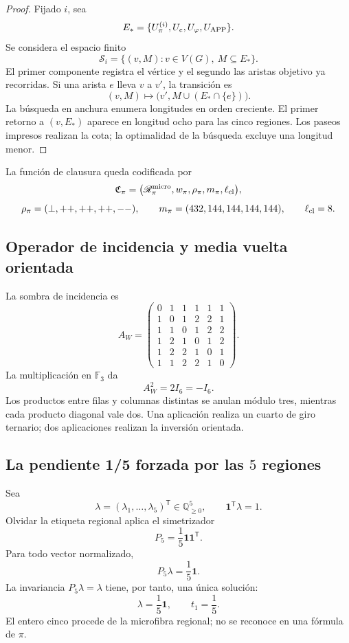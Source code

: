 \begin{proof}
Fijado \(i\), sea
\[
 E_*=\{U_\pi^{(i)},U_e,U_\varphi,U_{\rm APP}\}.
\]
Se considera el espacio finito
\[
 \mathscr S_i=\{(v,M):v\in V(G),\ M\subseteq E_*\}.
\]
El primer componente registra el vértice y el segundo las aristas objetivo
ya recorridas. Si una arista \(e\) lleva \(v\) a \(v'\), la transición es
\[
 (v,M)\longmapsto
 \bigl(v',M\cup(E_*\cap\{e\})\bigr).
\]
La búsqueda en anchura enumera longitudes en orden creciente. El primer
retorno a \((v,E_*)\) aparece en longitud ocho para las cinco regiones.
Los paseos impresos realizan la cota; la optimalidad de la búsqueda excluye
una longitud menor.
\end{proof}

La función de clausura queda codificada por
\[
 \mathfrak C_\pi=
 \bigl(\mathscr R_\pi^{\rm micro},
 w_\pi,\rho_\pi,m_\pi,\ell_{\rm cl}\bigr),
\]
\[
 \rho_\pi=(\perp,++ ,++ ,++ ,--),
 \qquad
 m_\pi=(432,144,144,144,144),
 \qquad
 \ell_{\rm cl}=8.
\]

\subsection{Operador de incidencia y media vuelta orientada}

La sombra de incidencia es
\[
 A_W=
 \begin{pmatrix}
 0&1&1&1&1&1\\
 1&0&1&2&2&1\\
 1&1&0&1&2&2\\
 1&2&1&0&1&2\\
 1&2&2&1&0&1\\
 1&1&2&2&1&0
 \end{pmatrix}.
\]
La multiplicación en \(\mathbb F_3\) da
\begin{equation}
 \boxed{A_W^2=2I_6=-I_6.}
 \label{p12-83-c9-s1:eq:aw-cuadrado-menos-identidad-pi}
\end{equation}
Los productos entre filas y columnas distintas se anulan módulo tres,
mientras cada producto diagonal vale dos. Una aplicación realiza un cuarto
de giro ternario; dos aplicaciones realizan la inversión orientada.

\subsection{La pendiente 1/5 forzada por las \(5\) regiones}

Sea
\[
 \lambda=(\lambda_1,\ldots,\lambda_5)^{\mathsf T}
 \in\mathbb Q_{\geq0}^5,
 \qquad
 \mathbf1^{\mathsf T}\lambda=1.
\]
Olvidar la etiqueta regional aplica el simetrizador
\[
 P_5=\frac15\mathbf1\mathbf1^{\mathsf T}.
\]
Para todo vector normalizado,
\[
 P_5\lambda=\frac15\mathbf1.
\]
La invariancia \(P_5\lambda=\lambda\) tiene, por tanto, una única solución:
\begin{equation}
 \boxed{\lambda=\frac15\mathbf1,\qquad t_1=\frac15.}
 \label{p12-83-c9-s1:eq:pendiente-primitiva-pi}
\end{equation}
El entero cinco procede de la microfibra regional; no se reconoce en una
fórmula de \(\pi\).

